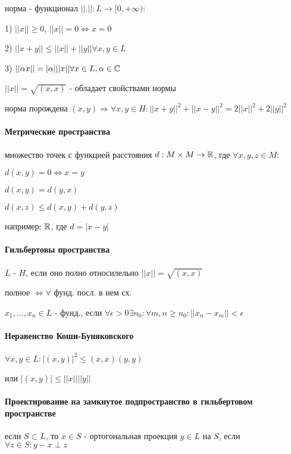 \documentclass[russian,twocolumn]{article}
\begin{document}
норма - функционал $||.||:L \to [0, +\infty)$:

1) $||x|| \ge 0$, $||x|| = 0 \iff x = 0$

2) $||x + y|| \le ||x|| + ||y|| \forall x,y \in L$

3) $||\alpha x|| = |\alpha| ||x|| \forall x \in L, \alpha \in \Bbb C$

$||x||=\sqrt{(x,x)}$ - обладает свойствами нормы

норма порождена $(x,y)\Rightarrow\forall x,y \in H : ||x+y||^2 + ||x-y||^2 = 2||x||^2 + 2||y||^2$

\paragraph{Метрические пространства}

множество точек с функцией расстояния $d:M \times M \to \Bbb R$, где $\forall x,y,z \in M$:

$d(x,y) = 0 \iff x=y$

$d(x,y) = d(y,x)$

$d(x,z) \le d(x,y) + d(y,z)$

например: $\Bbb R$, где $d = |x - y|$

\paragraph{Гильбертовы пространства}

$L$ - $H$, если оно полно относилельно $||x||=\sqrt{(x,x)}$

полное $\iff \forall$ фунд. посл. в нем сх.

$x_1,...,x_n \in L$ - фунд., если $\forall \epsilon > 0 \exists n_0 : \forall m,n \ge n_0 : ||x_n - x_m|| < \epsilon $

\paragraph{Неравенство Коши-Буняковского}

$\forall x,y \in L : |(x,y)|^2 \le (x,x)(y,y)$

или $|(x,y)| \le ||x|| ||y||$

\paragraph{Проектирование на замкнутое подпространство в гильбертовом пространстве}

если $S \subset L$, то $x \in S$ - ортогональная проекция $y \in L$ на $S$, если $\forall z \in S : y-x \perp z$ 
\end{document}
